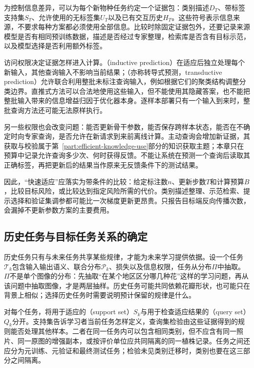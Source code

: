 为控制信息差异，可以为每个新物种任务约定一个证据包：类别描述$D_T$、带标签支持集$S_T$、允许使用的无标签集$U_T$以及已有交互历史$H_T$。这些符号表示信息来源，不要求每种方案都必须使用全部信息。比较时除固定证据包外，还要记录来源模型是否有相同预训练数据，描述是否经过专家整理，检索库是否含有目标示范，以及模型选择是否利用额外标签。

访问权限决定证据怎样进入计算。（inductive prediction）在适应后独立处理每个新输入，其他查询输入不影响当前结果；（亦称转导式预测，transductive prediction）允许联合利用整批未标注查询输入，例如根据它们的聚类结构调整分类边界。直推式方法可以合法地使用这些输入，但不能使用其隐藏答案，也不能把整批输入带来的信息增益归因于优化器本身。逐样本部署只有一个输入到来时，整批查询方法还可能无法原样执行。

另一些权限也会改变问题：能否更新骨干参数，能否保存跨样本状态，能否在不确定时向专家查询，是否允许在新请求到来前离线计算。主动查询会增加新证据，其获取与校验属于第~\ref{part:efficient-knowledge-use}部分的知识获取主题；本章只在预算中记录允许查询多少次、何时获得反馈。不能让系统在预测一个查询后读取其正确标签，再把更新后的结果当作原来无反馈条件下的测试结果。

因此，“快速适应”应落实为带条件的比较：给定标注数$n$、更新步数$T$和计算预算$B$，比较目标风险，或比较达到指定风险所需的代价。类别描述整理、示范检索、提示选择和验证集调参都可能比一次梯度更新更昂贵。只报告目标端反向传播次数，会漏掉不更新参数方案的主要费用。

\subsection{历史任务与目标任务关系的确定}
\label{sec:ket-transfer-task-splits}

历史任务只有与未来任务共享某些规律，才能为未来学习提供依据。设一个任务$\mathcal T_k$包含输入输出语义、联合分布$\mathcal P_k$、损失以及信息权限，任务从分布$\Pi$中抽取。$\Pi$不是单个图像的分布：先抽取“在某个地区区分哪几种花”这样的学习问题，再从该问题中抽取图像，才是两层抽样。历史任务可能共同依赖花瓣形状，也可能只在背景上相似；选择历史任务时需要说明预计保留的规律是什么。

对每个任务，将用于适应的（support set）$S_k$与用于检查适应结果的（query set）$Q_k$分开。支持集告诉学习者当前任务怎样定义，查询集检验由这些证据得到的规则能否处理其他样本。二者在同一任务内可以包含相同类别，但不应含有同一照片、同一原图的增强副本，或按评价单位应共同隔离的同一植株记录。任务之间还应分为元训练、元验证和最终测试任务；检验未见类别迁移时，类别也要在这三部分之间隔离。

